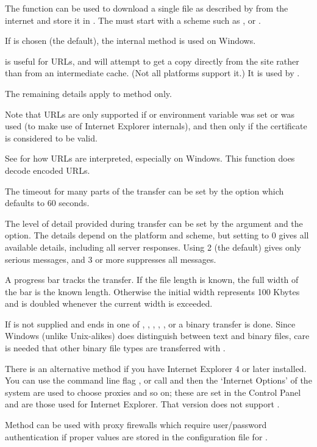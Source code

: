 %
\begin{Details}\relax
The function  can be used to download a single
file as described by  from the internet and store it in
.
The  must start with a scheme such as
,  or .

If  is chosen (the default), the internal method
is used on Windows.

 is useful for  URLs, and will
attempt to get a copy directly from the site rather than from an
intermediate cache.  (Not all platforms support it.)
It is used by .

The remaining details apply to method  only.

Note that  URLs are
only supported if  or environment variable
 was set or 
 was used (to make use of Internet
Explorer internals), and then only if the certificate is considered to
be valid.

See  for how  URLs are interpreted,
especially on Windows.  This function does decode encoded URLs.

The timeout for many parts of the transfer can be set by the option
 which defaults to 60 seconds.

The level of detail provided during transfer can be set by the
 argument and the  option.  The
details depend on the platform and scheme, but setting
 to 0 gives all available details, including
all server responses.  Using 2 (the default) gives only serious
messages, and 3 or more suppresses all messages.

A progress bar tracks the transfer.  If the file length is known, the
full width of the bar is the known length.  Otherwise the initial
width represents 100 Kbytes and is doubled whenever the current width
is exceeded.

If  is not supplied and  ends in one of
, , , , ,
 or  a binary transfer is done.  Since Windows
(unlike Unix-alikes) does distinguish between text and binary files,
care is needed that other binary file types are transferred with
.

There is an alternative method if you have Internet Explorer 4 or
later installed.   You can use the command line flag , 
or call  and then 
the `Internet Options' of the system are used to choose proxies
and so on; these are set in the Control Panel and are those used for
Internet Explorer.  That version does not support .

Method  can be used with proxy firewalls which require
user/password authentication if proper values are stored in the
configuration file for .
\end{Details}
